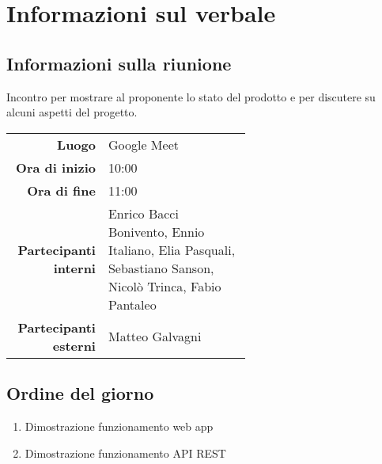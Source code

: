 \section{Informazioni sul verbale}

\subsection{Informazioni sulla riunione}
Incontro per mostrare al proponente lo stato del prodotto e per discutere su alcuni aspetti del progetto.

\begin{center}
	\begin{tabular}{r|p{0.6\linewidth}}
		\toprule
		\textbf{Luogo} & Google Meet \\
		\textbf{Ora di inizio} & 10:00 \\
		\textbf{Ora di fine} & 11:00 \\
		\textbf{Partecipanti interni} & Enrico Bacci Bonivento, Ennio Italiano, Elia Pasquali, Sebastiano Sanson, Nicolò Trinca, Fabio Pantaleo \\
		\textbf{Partecipanti esterni} & Matteo Galvagni
	\end{tabular}
\end{center}

\medskip

\subsection{Ordine del giorno}

\begin{enumerate}
	\item Dimostrazione funzionamento web app
	\item Dimostrazione funzionamento API REST
\end{enumerate}
